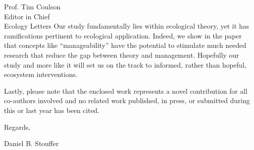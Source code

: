 \documentclass[10pt, a4paper]{letter}
\begin{document}
\begin{letter}{
       Prof. Tim Coulson\\
       Editor in Chief\\
       Ecology Letters}
Our study fundamentally lies within ecological theory, yet it has ramifications pertinent to ecological application. 
Indeed, we show in the paper that concepts like ``manageability'' have the potential to stimulate much needed research that reduce the gap between theory and management.
Hopefully our study and more like it will set us on the track to informed, rather than hopeful, ecosystem interventions. 

Lastly, please note that the enclosed work represents a novel contribution for all co-authors involved and no related work published, in press, or submitted during this or last year has been cited. 

\closing{Regards,}

Daniel B. Stouffer

\end{letter}
\end{document}
